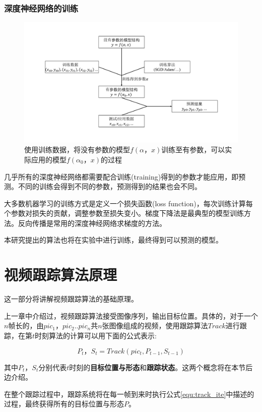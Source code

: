 \subsubsection{深度神经网络的训练}
\par
\begin{figure}[htbp!]
    \centering
    \includegraphics[width = 1.\textwidth]{chap/img/model_learning.pdf}
    \caption{使用训练数据，将没有参数的模型$f(\alpha，x)$训练至有参数，可以实际应用的模型$f(\alpha_0，x)$的过程}
    \label{fig:model_learning}
\end{figure}
几乎所有的深度神经网络都需要配合训练(training)得到的参数才能应用，即预测。不同的训练会得到不同的参数，预测得到的结果也会不同。
\par
大多数机器学习的训练方式是定义一个损失函数(loss function)，每次训练计算每个参数对损失的贡献，调整参数至损失变小。梯度下降法是最典型的模型训练方法。反向传播是常用的深度神经网络求梯度的方法。
\par
本研究提出的算法也将在实验中进行训练，最终得到可以预测的模型。

\section{视频跟踪算法原理}
这一部分将讲解视频跟踪算法的基础原理。
\par
上一章中介绍过，视频跟踪算法接受图像序列，输出目标位置。具体的，对于一个$n$帧长的，由$pic_1，pic_2..pic_n$共$n$张图像组成的视频，使用跟踪算法$Track$进行跟踪，在第$t$时刻算法的计算可以用下面的公式表示:
\par
\begin{equation}\label{equ:track_ite}  P_t，S_t=Track(pic_{t},P_{t-1},S_{t-1})  \end{equation}
\par
其中$P_t$，$S_t$分别代表$t$时刻的\textbf{目标位置与形态}和\textbf{跟踪状态}。这两个概念将在本节后边介绍。
\par
在整个跟踪过程中，跟踪系统将在每一帧到来时执行公式\ref{equ:track_ite}中描述的过程，最终获得所有的目标位置与形态$P$。
\par
